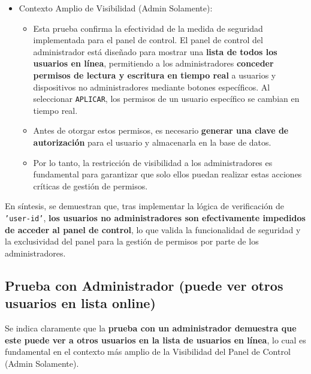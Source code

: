 \documentclass{report}
\begin{document}
\begin{itemize}
    \item Contexto Amplio de Visibilidad (Admin Solamente):
    \begin{itemize}
        \item Esta prueba confirma la efectividad de la medida de seguridad implementada para el panel de control. El panel de control del administrador 
              está diseñado para mostrar una \textbf{lista de todos los usuarios en línea}, permitiendo a los administradores \textbf{conceder permisos 
              de lectura y escritura en tiempo real} a usuarios y dispositivos no administradores mediante botones específicos. Al seleccionar 
              \texttt{APLICAR}, los permisos de un usuario específico se cambian en tiempo real.
        \item Antes de otorgar estos permisos, es necesario \textbf{generar una clave de autorización} para el usuario y almacenarla en la base de datos.
        \item Por lo tanto, la restricción de visibilidad a los administradores es fundamental para garantizar que solo ellos puedan realizar estas 
              acciones críticas de gestión de permisos.
    \end{itemize}
\end{itemize}

En síntesis, se  demuestran que, tras implementar la lógica de verificación de \texttt{'user-id'}, \textbf{los usuarios no administradores son 
efectivamente impedidos de acceder al panel de control}, lo que valida la funcionalidad de seguridad y la exclusividad del panel para la gestión de 
permisos por parte de los administradores.

\subsection{Prueba con Administrador (puede ver otros usuarios en lista online)}
Se indica claramente que la \textbf{prueba con un administrador demuestra que este puede ver a otros usuarios en la lista de usuarios en línea}, 
lo cual es fundamental en el contexto más amplio de la Visibilidad del Panel de Control (Admin Solamente).
\end{document}
